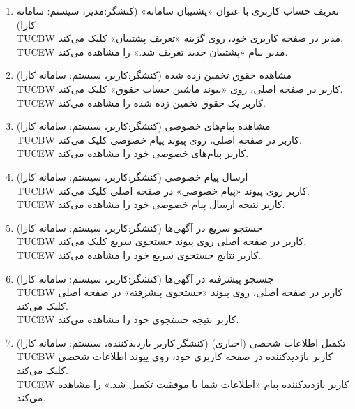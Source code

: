 \documentclass[12pt]{article}
\begin{document}
\begin{enumerate}
		\item
		تعریف حساب کاربری با عنوان «پشتیبان سامانه» (کنشگر:‌مدیر، سیستم: سامانه کارا)\\
		TUCBW مدیر در صفحه کاربری خود، روی گزینه «تعریف پشتیبان» کلیک می‌کند.\\
		TUCEW مدیر پیام «پشتیبان جدید تعریف شد.» را مشاهده می‌کند.\\

		\item
		مشاهده حقوق تخمین زده شده (کنشگر:‌کاربر، سیستم: سامانه کارا)\faStar\\
		TUCBW کاربر در صفحه اصلی، روی «پیوند ماشین حساب حقوق» کلیک می‌کند.\\
		TUCEW کاربر یک حقوق تخمین زده شده را مشاهده می‌کند.\\

		\item
		مشاهده پیام‌های خصوصی (کنشگر:‌کاربر، سیستم: سامانه کارا)\\
		TUCBW کاربر در صفحه اصلی، روی پیوند پیام خصوصی کلیک می‌کند.\\
		TUCEW کاربر پیام‌های خصوصی خود را مشاهده می‌کند.\\

		\item
		ارسال پیام خصوصی (کنشگر:‌کاربر، سیستم: سامانه کارا)\faStar\\
		TUCBW کاربر روی پیوند «پیام خصوصی» در صفحه اصلی کلیک می‌کند.\\
		TUCEW کاربر نتیجه ارسال پیام خصوصی خود را مشاهده می‌کند.\\

		\item
		جستجو سریع در آگهی‌ها (کنشگر:‌کاربر، سیستم: سامانه کارا)\\
		TUCBW کاربر در صفحه اصلی روی پیوند جستجوی سریع کلیک می‌کند.\\
		TUCEW کاربر نتایج جستجوی سریع خود را مشاهده می‌کند.\\

		\item
		جستجو پیشرفته در آگهی‌ها (کنشگر:‌کاربر، سیستم: سامانه کارا)\faStar\\
		TUCBW کاربر در صفحه اصلی، روی پیوند «جستجوی پیشرفته» در صفحه اصلی کلیک می‌کند.\\
		TUCEW کاربر نتیجه جستجوی خود را مشاهده می‌کند.\\

		\item
		تکمیل اطلاعات شخصی  (اجباری) (کنشگر:‌کاربر بازدید‌کننده، سیستم: سامانه کارا)\\
		TUCBW کاربر بازدید‌کننده در صفحه کاربری خود، روی پیوند اطلاعات شخصی کلیک می‌کند.\\
		TUCEW کاربر بازدید‌کننده پیام «اطلاعات شما با موفقیت تکمیل شد.» را مشاهده می‌کند.\\


\end{enumerate}
\end{document}
